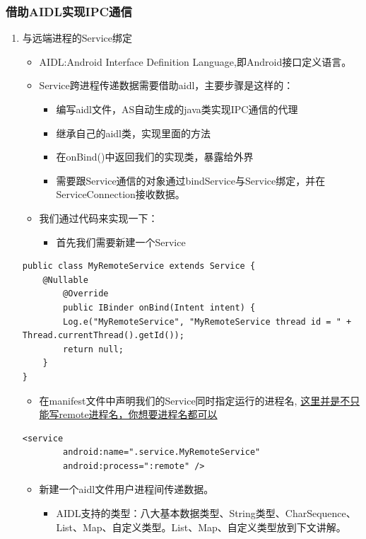 \documentclass[9pt, b5paper]{article}
\begin{document}
\subsubsection{借助AIDL实现IPC通信}
\label{sec-1-6-1}
\begin{enumerate}
\item 与远端进程的Service绑定
\label{sec-1-6-1-1}
\begin{itemize}
\item AIDL:Android Interface Definition Language,即Android接口定义语言。
\item Service跨进程传递数据需要借助aidl，主要步骤是这样的：
\begin{itemize}
\item 编写aidl文件，AS自动生成的java类实现IPC通信的代理
\item 继承自己的aidl类，实现里面的方法
\item 在onBind()中返回我们的实现类，暴露给外界
\item 需要跟Service通信的对象通过bindService与Service绑定，并在ServiceConnection接收数据。
\end{itemize}
\item 我们通过代码来实现一下：
\begin{itemize}
\item 首先我们需要新建一个Service
\end{itemize}
\end{itemize}
\begin{verbatim}
public class MyRemoteService extends Service {
	@Nullable
        @Override
        public IBinder onBind(Intent intent) {
  		Log.e("MyRemoteService", "MyRemoteService thread id = " + Thread.currentThread().getId());
        return null;
	}
}
\end{verbatim}
\begin{itemize}
\item 在manifest文件中声明我们的Service同时指定运行的进程名, \uline{这里并是不只能写remote进程名，你想要进程名都可以}
\end{itemize}
\begin{verbatim}
<service
        android:name=".service.MyRemoteService"
        android:process=":remote" />
\end{verbatim}
\begin{itemize}
\item 新建一个aidl文件用户进程间传递数据。
\begin{itemize}
\item AIDL支持的类型：八大基本数据类型、String类型、CharSequence、List、Map、自定义类型。List、Map、自定义类型放到下文讲解。

\end{itemize}
\end{itemize}
\end{enumerate}
\end{document}
